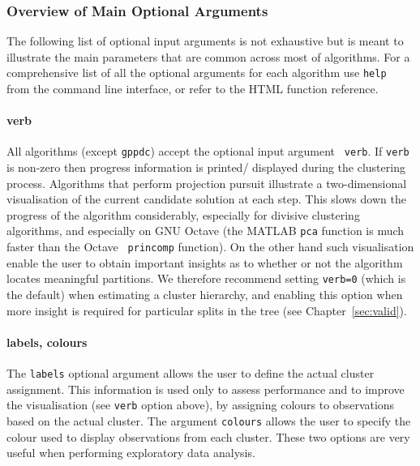 \documentclass{book}
\begin{document}
\subsubsection*{Overview of Main Optional Arguments}


The following list of optional input arguments is not exhaustive but is meant to illustrate the main
parameters that are common across most of algorithms.
For a comprehensive list of all the optional arguments for each algorithm
use {\tt help } from the command line interface, or refer to the HTML
function reference.

\paragraph{verb}
%
All algorithms (except {\tt gppdc}) accept the optional input argument {\tt
verb}. If {\tt verb} is non-zero then progress information is printed/
displayed during the clustering process. Algorithms that perform projection
pursuit illustrate a two-dimensional visualisation of the current candidate
solution at each step. This slows down the progress of the algorithm
considerably, especially for divisive clustering algorithms, and especially on
GNU Octave (the MATLAB {\tt pca} function is much faster than the Octave {\tt
princomp} function). On the other hand such visualisation enable the user to
obtain important insights as to whether or not the algorithm locates meaningful
partitions. We therefore recommend setting {\tt verb=0} (which is the default)
when estimating a cluster hierarchy, and enabling this option when more insight
is required for particular splits in the tree (see Chapter~\ref{sec:valid}).

\paragraph{labels, colours}
%
The {\tt labels} optional argument allows the user to define the actual cluster
assignment. This information is used only to assess performance and to improve
the visualisation (see {\tt verb} option above), by assigning colours to
observations based on the actual cluster. The argument {\tt colours} allows the
user to specify the colour used to display observations from each cluster.
These two options are very useful when performing exploratory data analysis.
\end{document}
